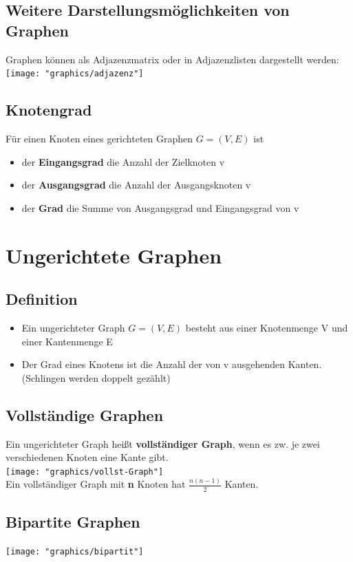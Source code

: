 \documentclass{scrreprt}
\begin{document}
\subsection{Weitere Darstellungsmöglichkeiten von Graphen}
Graphen können als Adjazenzmatrix oder in Adjazenzlisten dargestellt werden:\\
\texttt{[image: "graphics/adjazenz"]}
\subsection{Knotengrad}
Für einen Knoten eines gerichteten Graphen $G=(V,E)$ ist
\begin{itemize}
    \item der \textbf{Eingangsgrad} die Anzahl der Zielknoten v
    \item der \textbf{Ausgangsgrad} die Anzahl der Ausgangsknoten v
    \item der \textbf{Grad} die Summe von Ausgangsgrad und Eingangsgrad von v
\end{itemize}
\section{Ungerichtete Graphen}
\subsection{Definition}
\begin{itemize}
    \item Ein ungerichteter Graph $G=(V,E)$ besteht aus einer Knotenmenge V und einer Kantenmenge E
    \item Der Grad eines Knotens ist die Anzahl der von v ausgehenden Kanten.
    \\(Schlingen werden doppelt gezählt)
\end{itemize}
\subsection{Vollständige Graphen}
Ein ungerichteter Graph heißt \textbf{vollständiger Graph}, wenn es zw. je zwei verschiedenen Knoten eine Kante gibt.\\
\texttt{[image: "graphics/vollst-Graph"]}
\\
Ein vollständiger Graph mit \textbf{n} Knoten hat $\frac{n(n-1)}{2}$ Kanten.
\subsection{Bipartite Graphen}
\texttt{[image: "graphics/bipartit"]}
\pagebreak
\end{document}
